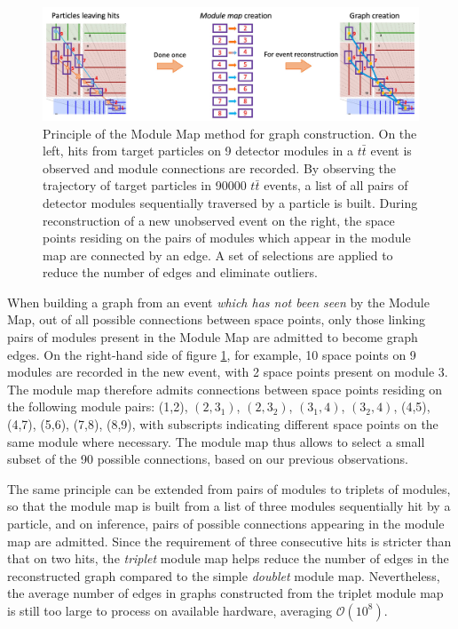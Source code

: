 \begin{figure}[h!]
    \centering
    \includegraphics[width=1\linewidth]{figures/module-map.png}
    \caption{Principle of the Module Map method for graph construction. On the left, hits from target particles on 9 detector modules in a $t\bar{t}$ event is observed and module connections are recorded. 
    By observing the trajectory of target particles in 90000 $t\bar{t}$ events, a list of all pairs of detector modules sequentially traversed by a particle is built. 
    During reconstruction of a new unobserved event on the right, the space points residing on the pairs of modules which appear in the module map are connected by an edge. 
    A set of selections are applied to reduce the number of edges and eliminate outliers.}
    \label{fig:module-map}
\end{figure}

When building a graph from an event \textit{which has not been seen} by the Module Map, out of all possible connections between space points, only those linking pairs of modules present in the Module Map are admitted to become graph edges. 
On the right-hand side of figure \ref{fig:module-map}, for example, 10 space points on 9 modules are recorded in the new event, with 2 space points present on module 3. 
The module map therefore admits connections between space points residing on the following module pairs: (1,2), $(2,3_1)$, $(2,3_2)$, $(3_1,4)$, $(3_2,4)$, (4,5), (4,7), (5,6), (7,8), (8,9), with subscripts indicating different space points on the same module where necessary. 
The module map thus allows to select a small subset of the 90 possible connections, based on our previous observations. 

The same principle can be extended from pairs of modules to triplets of modules, so that the module map is built from a list of three modules sequentially hit by a particle, and on inference, pairs of possible connections appearing in the module map are admitted. 
Since the requirement of three consecutive hits is stricter than that on two hits, the \textit{triplet} module map helps reduce the number of edges in the reconstructed graph compared to the simple \textit{doublet} module map. 
Nevertheless, the average number of edges in graphs constructed from the triplet module map is still too large to process on available hardware, averaging $\mathcal{O}(10^8)$. 

